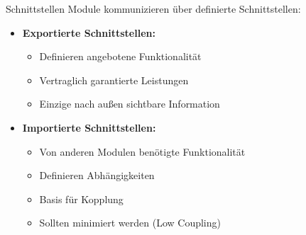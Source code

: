 \begin{definition}{Schnittstellen}
Module kommunizieren über definierte Schnittstellen:

\begin{itemize}
    \item \textbf{Exportierte Schnittstellen:}
    \begin{itemize}
        \item Definieren angebotene Funktionalität
        \item Vertraglich garantierte Leistungen
        \item Einzige nach außen sichtbare Information
    \end{itemize}
    
    \item \textbf{Importierte Schnittstellen:}
    \begin{itemize}
        \item Von anderen Modulen benötigte Funktionalität
        \item Definieren Abhängigkeiten
        \item Basis für Kopplung
        \item Sollten minimiert werden (Low Coupling)
    \end{itemize}
\end{itemize}
\end{definition}

